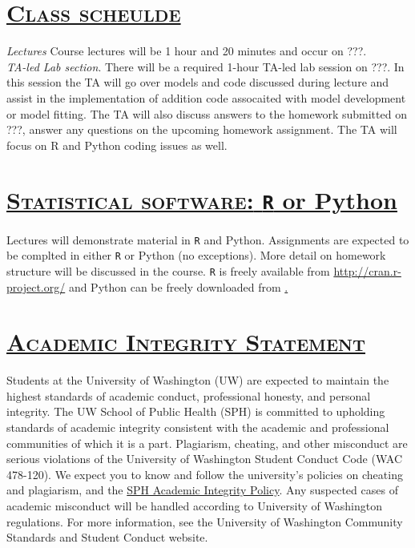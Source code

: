 \documentclass[fancyhdr,10pt]{article}
\begin{document}
\section*{\underline{\textsc{Class scheulde}}}
\textit{Lectures} Course lectures will be 1 hour and 20 minutes and occur on ???.\\

\textit{TA-led Lab section}. There will be a required 1-hour TA-led lab session on ???. In this session the TA will go over models and code discussed during lecture and assist in the implementation of addition code assocaited with model development or model fitting. The TA will also discuss answers to the homework submitted on ???, answer any questions on the upcoming homework assignment. The TA will focus on R and Python coding issues as well.

\section*{\underline{\textsc{Statistical software:} \texttt{R} or Python}}
Lectures will demonstrate material in \verb!R! and Python. Assignments are expected to be complted in either \verb!R! or Python (no exceptions). More detail on homework structure will be discussed in the course. \verb!R! is freely available from \href{http://cran.r-project.org/}{http://cran.r-project.org/} and Python can be freely downloaded from \href{https://www.python.org/downloads/release/python-3100/}.

\section*{\underline{\textsc{Academic Integrity Statement}}}

Students at the University of Washington (UW) are expected to maintain the highest standards of academic conduct, professional honesty, and personal integrity. The UW School of Public Health (SPH) is committed to upholding standards of academic integrity consistent with the academic and professional communities of which it is a part. Plagiarism, cheating, and other misconduct are serious violations of the University of Washington Student Conduct Code (WAC 478-120). We expect you to know and follow the university's policies on cheating and plagiarism, and the \href{https://sph.washington.edu/students/academic-integrity-policy}{SPH Academic Integrity Policy}. Any suspected cases of academic misconduct will be handled according to University of Washington regulations. For more information, see the University of Washington Community Standards and Student Conduct website.
\end{document}
